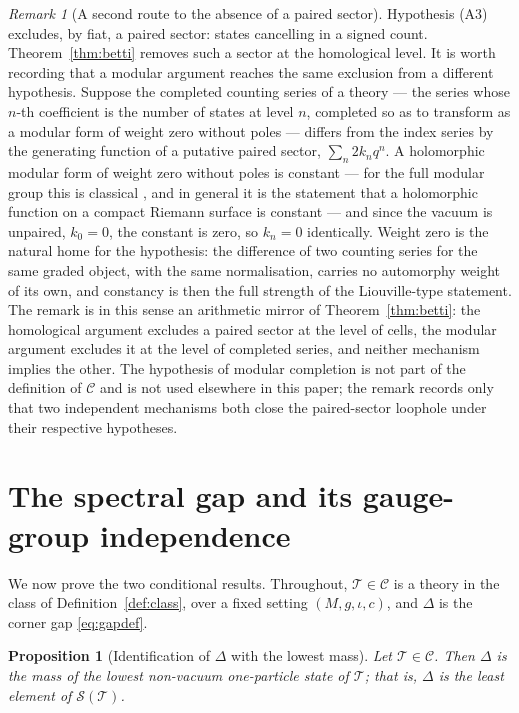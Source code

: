 \documentclass[11pt,a4paper]{article}
\newcommand{\class}{\mathcal{C}}
\newcommand{\thy}{\mathcal{T}}
\theoremstyle{plain}
\newtheorem{proposition}[theorem]{Proposition}
\theoremstyle{definition}
\theoremstyle{remark}
\newtheorem{remark}[theorem]{Remark}
\begin{document}
\begin{remark}[A second route to the absence of a paired sector]
\label{rem:secondroute}
Hypothesis (A3) excludes, by fiat, a paired sector: states cancelling
in a signed count. Theorem~\ref{thm:betti} removes such a sector at
the homological level. It is worth recording that a modular argument
reaches the same exclusion from a different hypothesis. Suppose the
completed counting series of a theory --- the series whose $n$-th
coefficient is the number of states at level $n$, completed so as to
transform as a modular form of weight zero without poles --- differs
from the index series by the generating function of a putative paired
sector, $\sum_n 2k_n q^n$. A holomorphic modular form of weight zero
without poles is constant --- for the full modular group this is
classical \cite[Ch.~VII]{Serre}, and in general it is the statement
that a holomorphic function on a compact Riemann surface is
constant --- and since the vacuum
is unpaired, $k_0 = 0$, the constant is zero, so $k_n = 0$
identically. Weight zero is the natural home for the hypothesis: the
difference of two counting series for the same graded object, with
the same normalisation, carries no automorphy weight of its own, and
constancy is then the full strength of the Liouville-type statement.
The remark is in this sense an arithmetic mirror of
Theorem~\ref{thm:betti}: the homological argument excludes a paired
sector at the level of cells, the modular argument excludes it at the
level of completed series, and neither mechanism implies the other.
The hypothesis of modular completion is not part of the definition of
$\class$ and is not used elsewhere in this paper; the remark records
only that two independent mechanisms both close the paired-sector
loophole under their respective hypotheses.
\end{remark}

\section{The spectral gap and its gauge-group independence}\label{sec:gap}

We now prove the two conditional results. Throughout, $\thy \in
\class$ is a theory in the class of Definition~\ref{def:class}, over
a fixed setting $(M, g, \iota, c)$, and $\Delta$ is the corner gap
\eqref{eq:gapdef}.

\begin{proposition}[Identification of $\Delta$ with the lowest
mass]\label{prop:identification}
Let $\thy \in \class$. Then $\Delta$ is the mass of the lowest
non-vacuum one-particle state of $\thy$; that is, $\Delta$ is the
least element of $\mathcal{S}(\thy)$.
\end{proposition}
\end{document}
